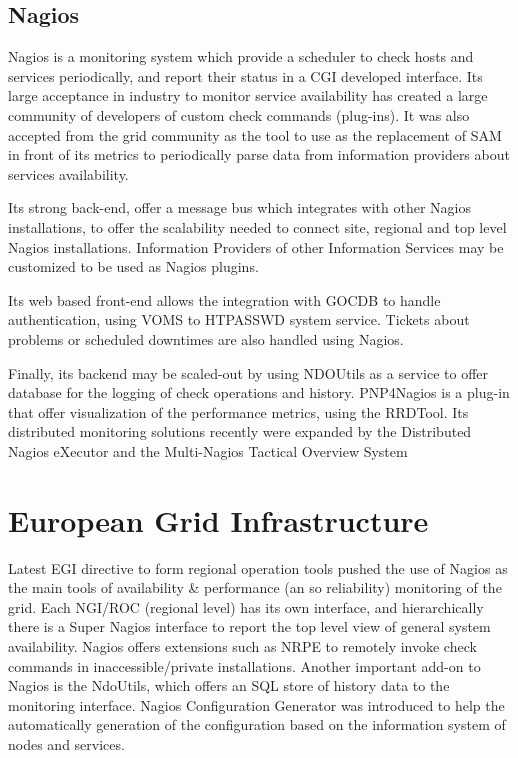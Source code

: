 \subsection{Nagios}
Nagios is a monitoring system which provide a scheduler to check hosts and services periodically, and report their status in a CGI developed interface. Its large acceptance in industry to monitor service availability has created a large community of developers of custom check commands (plug-ins). It was also accepted from the grid community as the tool to use as the replacement of SAM in front of its metrics to periodically parse data from information providers about services availability.

Its strong back-end, offer a message bus which integrates with other Nagios installations, to offer the scalability needed to connect site, regional and top level Nagios installations. Information Providers of other Information Services may be customized to be used as Nagios plugins.

Its web based front-end allows the integration with GOCDB to handle authentication, using VOMS to HTPASSWD system service. Tickets about problems or scheduled downtimes are also handled using Nagios.

Finally, its backend may be scaled-out by using NDOUtils as a service to offer database for the logging of check operations and history. PNP4Nagios is a plug-in that offer visualization of the performance metrics, using the RRDTool. Its distributed monitoring solutions recently were expanded by the Distributed Nagios eXecutor and the Multi-Nagios Tactical Overview System \cite{Nagios}

\section{European Grid Infrastructure}
Latest EGI directive to form regional operation tools pushed the use of Nagios \cite{imamagic2007grid} as the main tools of availability \& performance (an so reliability) monitoring of the grid. Each NGI/ROC (regional level) has its own interface, and hierarchically there is a Super Nagios interface to report the top level view of general system availability. Nagios offers extensions such as NRPE to remotely invoke check commands in inaccessible/private installations. Another important add-on to Nagios is the NdoUtils, which offers an SQL store of history data to the monitoring interface. Nagios Configuration Generator was introduced to help the automatically generation of the configuration based on the information system of nodes and services.

